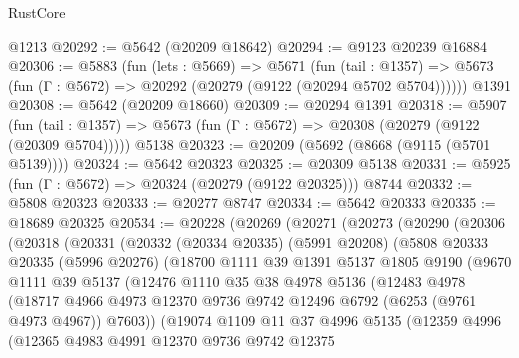 \begin{lexlean}{RustCore}
\begin{coremodule}
    @1213
@20292 := @5642 (@20209 @18642)
@20294 := @9123 @20239 @16884
@20306 := @5883
    (fun (lets : @5669) =>
    @5671
      (fun (tail : @1357) =>
      @5673 (fun (Γ : @5672) => @20292 (@20279 (@9122 (@20294 @5702 @5704))))))
    @1391
@20308 := @5642 (@20209 @18660)
@20309 := @20294 @1391
@20318 := @5907
    (fun (tail : @1357) => @5673 (fun (Γ : @5672) => @20308 (@20279 (@9122 (@20309 @5704)))))
    @5138
@20323 := @20209 (@5692 (@8668 (@9115 (@5701 @5139))))
@20324 := @5642 @20323
@20325 := @20309 @5138
@20331 := @5925 (fun (Γ : @5672) => @20324 (@20279 (@9122 @20325))) @8744
@20332 := @5808 @20323
@20333 := @20277 @8747
@20334 := @5642 @20333
@20335 := @18689 @20325
@20534 := @20228
    (@20269
      (@20271
        (@20273
          (@20290
            (@20306
              (@20318
                (@20331
                  (@20332
                    (@20334 @20335)
                    (@5991 @20208)
                    (@5808
                      @20333
                      @20335
                      (@5996 @20276)
                      (@18700
                        @1111
                        @39
                        @1391
                        @5137
                        @1805
                        @9190
                        (@9670
                          @1111
                          @39
                          @5137
                          (@12476
                            @1110
                            @35
                            @38
                            @4978
                            @5136
                            (@12483
                              @4978
                              (@18717
                                @4966
                                @4973
                                @12370
                                @9736
                                @9742
                                @12496
                                @6792
                                (@6253 (@9761 @4973 @4967))
                                @7603))
                            (@19074
                              @1109
                              @11
                              @37
                              @4996
                              @5135
                              (@12359
                                @4996
                                (@12365
                                  @4983
                                  @4991
                                  @12370
                                  @9736
                                  @9742
                                  @12375

\end{coremodule}
\end{lexlean}
